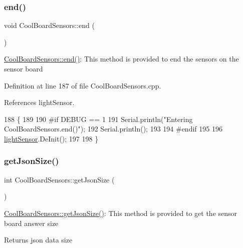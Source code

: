 \mbox{\label{classCoolBoardSensors_a4902b69f6e628bd6557193758fdd2bae}} 
\subsubsection{\texorpdfstring{end()}{end()}}
{\footnotesize\ttfamily void Cool\+Board\+Sensors\+::end (\begin{DoxyParamCaption}{ }\end{DoxyParamCaption})}

\hyperlink{classCoolBoardSensors_a4902b69f6e628bd6557193758fdd2bae}{Cool\+Board\+Sensors\+::end()}\+: This method is provided to end the sensors on the sensor board 

Definition at line 187 of file Cool\+Board\+Sensors.\+cpp.



References light\+Sensor.


\begin{DoxyCode}
188 \{
189 
190 \textcolor{preprocessor}{#if DEBUG == 1  }
191     Serial.println(\textcolor{stringliteral}{"Entering CoolBoardSensors.end()"});
192     Serial.println();
193 
194 \textcolor{preprocessor}{#endif}
195 
196     \hyperlink{classCoolBoardSensors_a3e397300fb707dd193e909a757bf6102}{lightSensor}.DeInit();
197 
198 \}
\end{DoxyCode}
\mbox{\label{classCoolBoardSensors_ab82c2a1633768ccd12a589320fa31a14}} 
\subsubsection{\texorpdfstring{get\+Json\+Size()}{getJsonSize()}}
{\footnotesize\ttfamily int Cool\+Board\+Sensors\+::get\+Json\+Size (\begin{DoxyParamCaption}{ }\end{DoxyParamCaption})}

\hyperlink{classCoolBoardSensors_ab82c2a1633768ccd12a589320fa31a14}{Cool\+Board\+Sensors\+::get\+Json\+Size()}\+: This method is provided to get the sensor board answer size

\begin{DoxyReturn}{Returns}
json data size 
\end{DoxyReturn}


